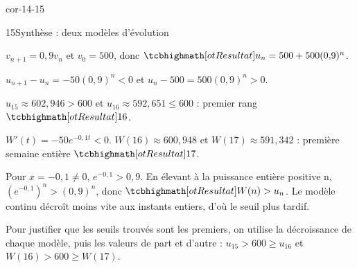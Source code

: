 \begin{blocLivre}{cor-14-15}
\begin{corrige}{15}{Synthèse : deux modèles d'évolution}
\begin{questions}
\item $v_{n+1}=0{,}9v_n$ et $v_0=500$, donc $\res{u_n=500+500(0{,}9)^n}$.
\item $u_{n+1}-u_n=-50(0{,}9)^n<0$ et $u_n-500=500(0{,}9)^n>0$.
\item $u_{15}\approx602{,}946>600$ et $u_{16}\approx592{,}651\leq600$ : premier rang $\res{16}$.
\item $W\prime(t)=-50e^{-0{,}1t}<0$. $W(16)\approx600{,}948$ et $W(17)\approx591{,}342$ : première semaine entière $\res{17}$.
\item Pour $x=-0{,}1\neq0$, $e^{-0{,}1}>0{,}9$. En élevant à la puissance entière positive n, $(e^{-0{,}1})^n>(0{,}9)^n$, donc $\res{W(n)>u_n}$. Le modèle continu décroît moins vite aux instants entiers, d’où le seuil plus tardif.
\end{questions}

Pour justifier que les seuils trouvés sont les premiers, on utilise la décroissance de chaque modèle, puis les valeurs de part et d’autre : $u_{15}>600\geq u_{16}$ et $W(16)>600\geq W(17)$.

\label{figlivre-r14-15-modeles-cor}

\end{corrige}
\end{blocLivre}
